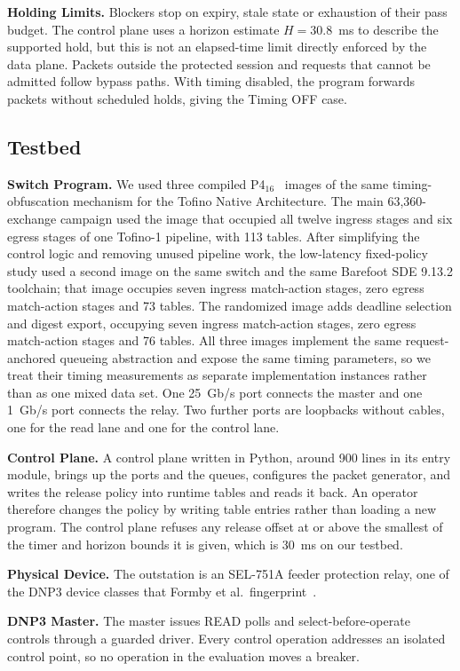 \textbf{Holding Limits.} Blockers stop on expiry, stale state or exhaustion of their pass budget.
The control plane uses a horizon estimate $H=30.8$~ms to describe the supported hold, but this is
not an elapsed-time limit directly enforced by the data plane. Packets outside the protected
session and requests that cannot be admitted follow bypass paths. With timing disabled, the program
forwards packets without scheduled holds, giving the Timing OFF case.

\subsection{Testbed}
\label{sec:impl:p4}

\textbf{Switch Program.} We used three compiled P4$_{16}$~\cite{p4ccr2014} images of the same timing-obfuscation
mechanism for the Tofino Native Architecture. The main 63{,}360-exchange campaign used the image that occupied all twelve ingress
stages and six egress stages of one Tofino-1 pipeline, with 113 tables. After simplifying the
control logic and removing unused pipeline work, the low-latency fixed-policy study used a second
image on the same switch and the same Barefoot SDE 9.13.2 toolchain; that image occupies seven
ingress match-action stages, zero egress match-action stages and 73 tables. The randomized image
adds deadline selection and digest export, occupying seven ingress match-action stages, zero egress
match-action stages and 76 tables. All three images implement the same request-anchored
queueing abstraction and expose the same timing parameters, so we treat their timing
measurements as separate implementation instances rather than as one mixed data set. One 25~Gb/s
port connects the master and one 1~Gb/s port connects the relay. Two further ports are loopbacks
without cables, one for the read lane and one for the control lane.

\textbf{Control Plane.} A control plane written in Python, around 900 lines in its entry module,
brings up the ports and the queues, configures the packet generator, and writes the release policy
into runtime tables and reads it back. An operator therefore changes the policy by writing table
entries rather than loading a new program. The control plane refuses any release offset at or above
the smallest of the timer and horizon bounds it is given, which is 30~ms on our testbed.

\textbf{Physical Device.} The outstation is an SEL-751A feeder protection relay, one of the DNP3
device classes that Formby et al.\ fingerprint~\cite{formby2016}.

\textbf{DNP3 Master.} The master issues READ polls and select-before-operate controls through a
guarded driver. Every control operation addresses an isolated control point, so no operation in the
evaluation moves a breaker.
